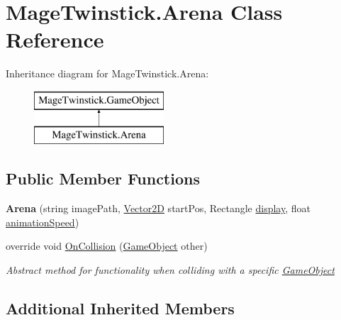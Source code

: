 \hypertarget{class_mage_twinstick_1_1_arena}{}\section{Mage\+Twinstick.\+Arena Class Reference}
\label{class_mage_twinstick_1_1_arena}
Inheritance diagram for Mage\+Twinstick.\+Arena\+:\begin{figure}[H]
\begin{center}
\leavevmode
\includegraphics[height=2.000000cm]{class_mage_twinstick_1_1_arena}
\end{center}
\end{figure}
\subsection*{Public Member Functions}
\begin{DoxyCompactItemize}
\item 
\hypertarget{class_mage_twinstick_1_1_arena_aace14406dc02031e9739a08e5be7301b}{}{\bfseries Arena} (string image\+Path, \hyperlink{class_mage_twinstick_1_1_vector2_d}{Vector2\+D} start\+Pos, Rectangle \hyperlink{class_mage_twinstick_1_1_game_object_a5807df7f837dc87c8955a008d0b27b50}{display}, float \hyperlink{class_mage_twinstick_1_1_game_object_a5d21c31402c27c5a19f2a62d98720456}{animation\+Speed})\label{class_mage_twinstick_1_1_arena_aace14406dc02031e9739a08e5be7301b}

\item 
override void \hyperlink{class_mage_twinstick_1_1_arena_a12cdc5acc58ee006eb0b5a47507934fc}{On\+Collision} (\hyperlink{class_mage_twinstick_1_1_game_object}{Game\+Object} other)
\begin{DoxyCompactList}\small\item\em Abstract method for functionality when colliding with a specific \hyperlink{class_mage_twinstick_1_1_game_object}{Game\+Object} \end{DoxyCompactList}\end{DoxyCompactItemize}
\subsection*{Additional Inherited Members}


